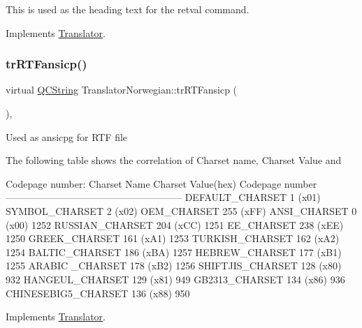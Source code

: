 This is used as the heading text for the retval command. 

Implements \mbox{\hyperlink{class_translator}{Translator}}.

\mbox{\label{class_translator_norwegian_a53fc2ec893e9135938981db15869f645}} 
\subsubsection{\texorpdfstring{trRTFansicp()}{trRTFansicp()}}
{\footnotesize\ttfamily virtual \mbox{\hyperlink{class_q_c_string}{Q\+C\+String}} Translator\+Norwegian\+::tr\+R\+T\+Fansicp (\begin{DoxyParamCaption}{ }\end{DoxyParamCaption})\hspace{0.3cm}{\ttfamily [inline]}, {\ttfamily [virtual]}}

Used as ansicpg for R\+TF file

The following table shows the correlation of Charset name, Charset Value and 
\begin{DoxyPre}
Codepage number:
Charset Name       Charset Value(hex)  Codepage number
------------------------------------------------------
DEFAULT\_CHARSET           1 (x01)
SYMBOL\_CHARSET            2 (x02)
OEM\_CHARSET             255 (xFF)
ANSI\_CHARSET              0 (x00)            1252
RUSSIAN\_CHARSET         204 (xCC)            1251
EE\_CHARSET              238 (xEE)            1250
GREEK\_CHARSET           161 (xA1)            1253
TURKISH\_CHARSET         162 (xA2)            1254
BALTIC\_CHARSET          186 (xBA)            1257
HEBREW\_CHARSET          177 (xB1)            1255
ARABIC \_CHARSET         178 (xB2)            1256
SHIFTJIS\_CHARSET        128 (x80)             932
HANGEUL\_CHARSET         129 (x81)             949
GB2313\_CHARSET          134 (x86)             936
CHINESEBIG5\_CHARSET     136 (x88)             950
\end{DoxyPre}
 

Implements \mbox{\hyperlink{class_translator_a9953a4c0e6a4fc7d017abcd5c2939e0f}{Translator}}.

\mbox{\label{class_translator_norwegian_a016327548c204763cf56e4fea6e4ad77}} 
